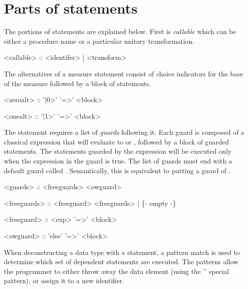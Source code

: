 \section{Parts of statements}\label{sec:bnfStatementPartsDefinition}
The portions of statements are explained below. First is
\emph{callable} which can be either a procedure name or a 
particular unitary transformation.

\begin{singlespace}
\begin{bnf}  
   <callable> :: <identifer> | <transform>
\end{bnf}
\end{singlespace}

The alternatives of a measure statement consist of choice indicators 
for the base of the measure followed by a block of statements.

\begin{singlespace}
\begin{bnf} 
   <zeroalt> ::  '|0>' '=>' <block>
  
   <onealt> :: '|1>' '=>' <block>
\end{bnf}
\end{singlespace}

The  statement requires a list of \emph{guards} following it.
Each guard is composed of a  classical expression that will evaluate to 
 or , followed by a block of guarded statements. 
The statements guarded by the expression will be executed only when
the expression in the guard is true. 
The list of guards must end with a  default guard
called . Semantically, this is equivalent to putting a guard of
.

\begin{singlespace}
\begin{bnf} 
   <guards> :: <freeguards> <owguard>

   <freeguards> :: <freeguard> <freeguards>
        | \{- empty -\}

   <freeguard> :: <exp> '=>' <block>

   <owguard> :: 'else' '=>' <block>
\end{bnf}
\end{singlespace}

When deconstructing a data type with a  statement, a
pattern match is used to determine which set of dependent 
 statements are executed. The patterns allow the programmer
to either throw away the data element (using the '\inlqpl{\_}' special 
pattern), or assign it to a new identifier.

